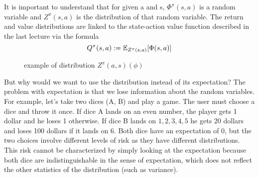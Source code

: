 \documentclass{article}
\begin{document}
It is important to understand that for given a and s, $\Phi^\pi(s, a)$ is a random variable and $Z^\pi(s, a)$ is the distribution of that random variable.
The return and value distributions are linked to the state-action value function described in the last lecture via the formula 
\begin{equation}
    Q^\pi(s, a) := \mathbb{E}_{Z^\pi(s, a)}[\Phi(s, a)]
\end{equation}

\begin{figure}[H]
    \centering
    \caption{example of distribution $Z^\pi(a,s)(\phi)$}
\end{figure}

But why would we want to use the distribution instead of its expectation? The problem with expectation is that we lose information about the random variables. \\

For example, let's take two dices (A, B) and play a game. The user must choose a dice and throw it once. If dice A lands on an even number, the player gets 1 dollar and he loses 1 otherwise. If dice B lands on ${1, 2, 3, 4 ,5}$ he gets 20 dollars and loses 100 dollars if it lands on 6. 
Both dice have an expectation of 0,
but the two choices involve different levels of risk as they have different distributions. 
This risk cannot be characterized by simply looking at the expectation because both dice are indistinguishable in the sense of expectation, which does not reflect the other statistics of the distribution (such as variance).\\
\end{document}

